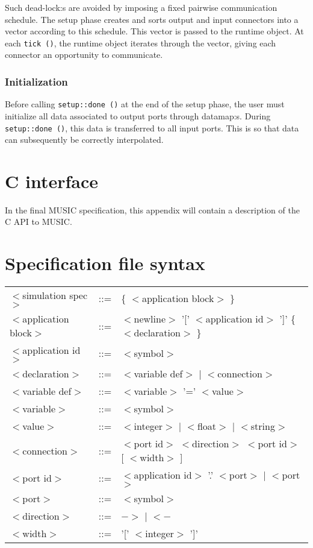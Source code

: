 \documentclass[a4paper]{report}
\begin{document}
\begin{metatext}
Such dead-lock:s are avoided by imposing a fixed pairwise
communication schedule.  The setup phase creates and sorts output and
input connectors into a vector according to this schedule.  This
vector is passed to the runtime object.  At each \lstinline|tick ()|, the
runtime object iterates through the vector, giving each connector an
opportunity to communicate.

\subsection{Initialization}

Before calling \lstinline|setup::done ()| at the end of the setup phase,
the user must initialize all data associated to output ports through
datamap:s.  During \lstinline|setup::done ()|, this data is transferred to
all input ports.  This is so that data can subsequently be correctly
interpolated.
\end{metatext}

\appendix

\chapter{C interface}

In the final MUSIC specification, this appendix will contain a
description of the C API to MUSIC.


\chapter{Specification file syntax}
\label{sec:specsyntax}

\newcommand{\nt}[1]{$<$#1$>$}

\begin{tabular}{lcl}
\nt{simulation spec}   & ::= & \{ \nt{application block} \} \\
\nt{application block} & ::= & \nt{newline} '[' \nt{application id} ']' \{ \nt{declaration}
\} \\
\nt{application id}    & ::= & \nt{symbol} \\
\nt{declaration}       & ::= & \nt{variable def} $|$ \nt{connection} \\
\nt{variable def}      & ::= & \nt{variable} '=' \nt{value} \\
\nt{variable}	       & ::= & \nt{symbol} \\
\nt{value} 	       & ::= & \nt{integer} $|$ \nt{float} $|$ \nt{string} \\
\nt{connection}	       & ::= & \nt{port id} \nt{direction} \nt{port id} [ \nt{width} ] \\
\nt{port id}	       & ::= & \nt{application id} '.' \nt{port} $|$
\nt{port} \\
\nt{port}	       & ::= & \nt{symbol} \\
\nt{direction}	       & ::= & $->$ $|$ $<-$ \\
\nt{width}	       & ::= & '[' \nt{integer} ']' \\
\end{tabular}

\printindex
\end{document}
